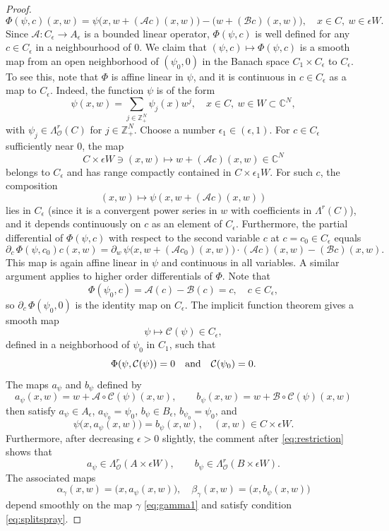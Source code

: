 \documentclass[11pt]{amsart}
\numberwithin{equation}{section}
\theoremstyle{definition}
\newcommand\Acal{\mathcal{A}}
\newcommand\Bcal{\mathcal{B}}
\newcommand\Ccal{\mathcal{C}}
\newcommand\Oscr{\mathscr{O}}
\newcommand\C{\mathbb{C}}
\newcommand\Z{\mathbb{Z}}
\newcommand\di{\partial}
\begin{document}
\begin{proof}
\begin{equation}\label{eq:Phi}
        \Phi(\psi,c)(x,w) =
        \psi\bigl(x,w+(\Acal c)(x,w)\bigr) - \bigl(w + (\Bcal c)(x,w)\bigr),
        \quad x\in C,\ w\in \epsilon W.
\end{equation}
Since $\Acal:C_\epsilon \to A_\epsilon$ is a bounded linear operator,
$\Phi(\psi,c)$ is well defined for any $c\in C_{\epsilon}$ 
in a neighbourhood of $0$. 
We claim that $(\psi,c)\mapsto \Phi(\psi,c)$ is a smooth map from 
an open neighborhood of $(\psi_0,0)$ in the Banach space 
$C_{1} \times C_{\epsilon}$ to $C_{\epsilon}$. 
To see this, note that $\Phi$ is affine linear in $\psi$, 
and it is continuous in $c\in C_{\epsilon}$ as a map 
to $C_{\epsilon}$. Indeed, the function $\psi$ is of the form
\[
	\psi(x,w)= \sum_{j \in \Z_+^N} \psi_j(x) w^j,\quad 
	x\in C,\ w\in W\subset\C^N, 
\]
with $\psi_j\in \Lambda^r_\Oscr(C)$ for $j\in \Z_+^N$.
Choose a number $\epsilon_1\in (\epsilon,1)$.
For $c\in C_{\epsilon}$ sufficiently near $0$, the map
\[
	C\times \epsilon W \ni (x,w) \mapsto w+(\Acal c)(x,w) \in \C^N 
\] 
belongs to $C_\epsilon$ and has range compactly 
contained in $C\times \epsilon_1 W$. For such $c$, the composition
\[
	(x,w) \mapsto \psi(x,w+(\Acal c)(x,w))
\]
lies in $C_{\epsilon}$ (since it is a convergent power series in $w$ 
with coefficients in $\Lambda^r(C)$), and it depends continuously on $c$ 
as an element of $C_{\epsilon}$. Furthermore, the partial differential 
of $\Phi(\psi,c)$ with respect to the second variable $c$ 
at $c=c_0\in C_{\epsilon}$ equals
\[
     \di_c\, \Phi(\psi,c_0) c(x,w) =
     \di_w\, \psi\bigl(x, w+(\Acal c_0)(x,w)\bigr) 
     \cdotp (\Acal c)(x,w) - (\Bcal c)(x,w).
\]
This map is again affine linear in $\psi$ and continuous in all variables.
A similar argument applies to higher order differentials of $\Phi$.
Note that 
\[
    \Phi(\psi_0,c)= \Acal(c)-\Bcal(c)=c,\quad c\in C_\epsilon,
\]
so $\di_c\, \Phi(\psi_0,0)$ is the identity map on $C_\epsilon$.
The implicit function theorem gives a smooth map 
\[
	\psi \longmapsto \Ccal(\psi) \in C_{\epsilon}, 
\]
defined in a neighborhood of $\psi_0$ in $C_1$, such that 
\[
	\Phi(\psi,\Ccal(\psi))=0 \quad {\rm and} \quad 
	\Ccal(\psi_0)=0.
\]
The maps $a_\psi$ and $b_\psi$ defined by
\begin{equation}\label{eq:apsi}
        a_\psi(x,w) = w + \Acal \circ \Ccal(\psi)(x,w), \qquad
        b_\psi(x,w) = w + \Bcal\circ \Ccal(\psi)(x,w)
\end{equation}
then satisfy $a_\psi\in A_{\epsilon}$,  $a_{\psi_0}=\psi_0$, 
$b_\psi\in B_\epsilon$, $b_{\psi_0}=\psi_0$, and
\[
        \psi\bigl(x,a_\psi(x,w)\bigr) = b_\psi(x,w),
        \quad (x,w)\in C \times \epsilon W.
\]
Furthermore, after decreasing $\epsilon>0$ slightly, the comment 
after \eqref{eq:restriction} shows that 
\[
	a_\psi\in \Lambda^r_\Oscr(A\times \epsilon W),
	\qquad 
	b_\psi\in \Lambda^r_\Oscr(B\times \epsilon W).
\]
The associated maps
\[
	\alpha_\gamma (x,w) = \bigl(x,a_\psi(x,w)\bigr),  \quad
	\beta_\gamma (x,w)  = \bigl(x,b_\psi(x,w)\bigr)
\]
depend smoothly on the map $\gamma$ \eqref{eq:gamma1} and satisfy 
condition \eqref{eq:splitspray}.


\end{proof}
\end{document}

